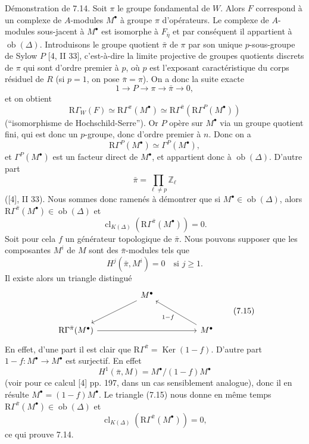 \documentclass[11pt]{article}
\newcommand{\R}{\mathrm{R}}\newcommand{\RHomCore}{\mathrm{RHom}}
\providecommand{\Ker}{\operatorname{Ker}}
\providecommand{\Ob}{\operatorname{ob}}
\providecommand{\Ker}{\operatorname{Ker}}
\providecommand{\Ker}{\operatorname{Ker}}
\providecommand{\Ob}{\operatorname{ob}}
\providecommand{\R}{\mathrm R}
\providecommand{\Ob}{\operatorname{Ob}}
\providecommand{\clK}[1]{\operatorname{cl}_{K(#1)}}
\providecommand{\RG}{\R\Gamma}
\providecommand{\Ob}{\operatorname{ob}}
\providecommand{\Ob}{\operatorname{Ob}}
\begin{document}
Démonstration de 7.14. Soit $\pi$ le groupe fondamental de $W$. Alors $F$ correspond à un complexe de $A$-modules $M^\bullet$ à groupe $\pi$ d'opérateurs. Le complexe de $A$-modules sous-jacent à $M^\bullet$ est isomorphe à $F_{\bar\eta}$ et par conséquent il appartient à $\Ob(\Delta)$. Introduisons le groupe quotient $\bar\pi$ de $\pi$ par son unique $p$-sous-groupe de Sylow $P$ [4, II 33], c'est-à-dire la limite projective de groupes quotients discrets de $\pi$ qui sont d'ordre premier à $p$, où $p$ est l'exposant caractéristique du corps résiduel de $R$ (si $p=1$, on pose $\bar\pi=\pi$). On a donc la suite exacte
\[
1\longrightarrow P\longrightarrow \pi\longrightarrow \bar\pi\longrightarrow0,
\]
et on obtient
\[
\RG_W(F)\simeq \R\Gamma^\pi(M^\bullet)
\simeq \R\Gamma^{\bar\pi}(\R\Gamma^P(M^\bullet))
\]
(``isomorphisme de Hochschild-Serre''). Or $P$ opère sur $M^\bullet$ via un groupe quotient fini, qui est donc un $p$-groupe, donc d'ordre premier à $n$. Donc on a
\[
\R\Gamma^P(M^\bullet)\simeq \Gamma^P(M^\bullet),
\]
et $\Gamma^P(M^\bullet)$ est un facteur direct de $M^\bullet$, et appartient donc à $\Ob(\Delta)$. D'autre part
\[
\bar\pi=\prod_{\ell\ne p}\mathbb Z_\ell
\]
([4], II 33). Nous sommes donc ramenés à démontrer que si $M^\bullet\in\Ob(\Delta)$, alors $\R\Gamma^{\bar\pi}(M^\bullet)\in\Ob(\Delta)$ et
\[
\clK{\Delta}(\R\Gamma^{\bar\pi}(M^\bullet))=0.
\]
Soit pour cela $f$ un générateur topologique de $\bar\pi$. Nous pouvons supposer que les composantes $M^i$ de $M$ sont des $\bar\pi$-modules tels que
\[
H^j(\bar\pi,M^i)=0\quad\text{si }j\ge1.
\]
Il existe alors un triangle distingué
\[
\begin{tikzcd}[column sep=huge,row sep=large]
& M^\bullet \arrow[dl] &\\
\R\Gamma^{\bar\pi}(M^\bullet) \arrow[rr] && M^\bullet \arrow[ul,"1-f"]
\end{tikzcd}
\tag{7.15}
\]
En effet, d'une part il est clair que $\R\Gamma^{\bar\pi}=\Ker(1-f)$. D'autre part $1-f:M^\bullet\to M^\bullet$ est surjectif. En effet
\[
H^1(\bar\pi,M)=M^\bullet/(1-f)M^\bullet
\]
(voir pour ce calcul [4] pp. 197, dans un cas sensiblement analogue), donc il en résulte $M^\bullet=(1-f)M^\bullet$. Le triangle (7.15) nous donne en même temps $\R\Gamma^{\bar\pi}(M^\bullet)\in\Ob(\Delta)$ et
\[
\clK{\Delta}(\R\Gamma^{\bar\pi}(M^\bullet))=0,
\]
ce qui prouve 7.14.
\end{document}

